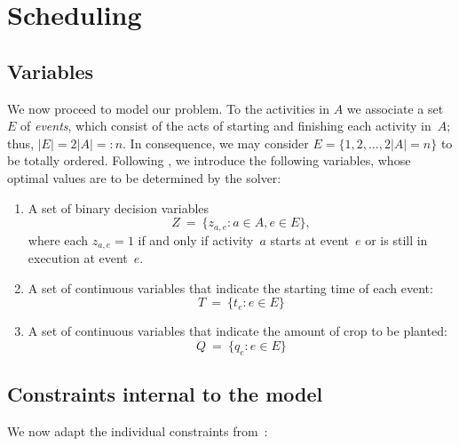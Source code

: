 \documentclass[11pt,reqno]{amsart}
\numberwithin{equation}{section}
\begin{document}
\section{Scheduling}

\subsection{Variables}

We now proceed to model our problem.  To the activities in $A$ we associate a set~$E$ of
\emph{events}, which consist of the acts of starting and finishing each activity in~$A$;
thus, $|E|=2|A|=:n$. In consequence, we may consider $E=\{1,2,\dots, 2|A|=n\}$ to be
totally ordered.  Following \cite{artigues-etal11}, we introduce the following variables,
whose optimal values are to be determined by the solver:

\begin{enumerate}
\item A set of binary decision variables 
  \[
     Z
     \ = \
     \big\{z_{a,e}: a\in A, e\in E\big\},
  \]
  where each $z_{a,e}=1$ if and only if activity~$a$ starts at
  event~$e$ or is still in execution at event~$e$.

\smallskip
\item A set of continuous variables that indicate the starting time of each event:
  \[
     T
     \ = \
     \big\{t_e : e\in E\big\}
  \]

\smallskip
\item A set of continuous variables that indicate the amount of crop to be planted:
  \[
     Q
     \ = \
     \big\{q_e : e\in E\big\}
  \]


\end{enumerate}

\subsection{Constraints internal to the model}

We now adapt the individual constraints from~\cite{artigues-etal11}:
\end{document}
